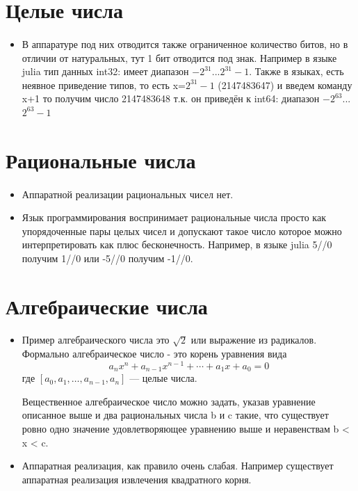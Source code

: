 \documentclass{article}
\begin{document}
\section{Целые числа}
\paragraph{}

\begin{itemize}
\item[] В аппаратуре под них отводится также ограниченное количество битов, но в отличии от натуральных, тут 1 бит отводится под знак.
Например в языке julia тип данных int32: имеет диапазон $-2^{31}$...$2^{31}-1$. Также в языках, есть неявное приведение типов, то есть x=$2^{31}-1$ (2147483647)
и введем команду x+1 то получим число 2147483648 т.к. он приведён к int64: диапазон $-2^{63}$...$2^{63}-1$
\end{itemize}   

\section{Рациональные числа}
\paragraph{}
\begin{itemize}
\item[] Аппаратной реализации рациональных чисел нет.
\item[] Язык программирования воспринимает рациональные числа просто как упорядоченные пары целых чисел и допускают такое число 
которое можно интерпретировать как плюс бесконечность. Например, в языке julia 5//0 получим 1//0 или -5//0 получим -1//0.
\end{itemize}   

\section{Алгебраические числа}
\paragraph{}

\begin{itemize}
\item[] Пример алгебраического числа это $\sqrt{2}$ или выражение из радикалов. Формально алгебраическое число - это корень
уравнения вида \[ a_nx^n + a_{n-1}x^{n-1} + \cdots + a_1x + a_0 = 0 \] где $[a_0, a_1, \dots, a_{n-1}, a_n]$ — целые числа.

Вещественное алгебраическое число можно задать, указав уравнение описанное выше и два рациональных числа b и c такие, что существует ровно одно 
значение удовлетворяющее уравнению выше и неравенствам b < x < c.
\item[] Аппаратная реализация, как правило очень слабая. Например существует аппаратная реализация извлечения квадратного корня.
\end{itemize}   
\end{document}
